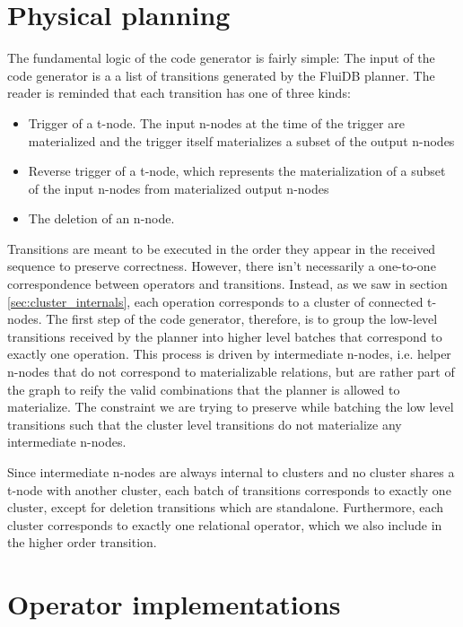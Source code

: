 \section{Physical planning}

The fundamental logic of the code generator is fairly simple: The
input of the code generator is a a list of transitions generated by
the FluiDB planner. The reader is reminded that each transition has
one of three kinds:

\begin{itemize}
\item Trigger of a t-node. The input n-nodes at the time of the trigger
are materialized and the trigger itself materializes a subset of the
output n-nodes
\item Reverse trigger of a t-node, which represents the
materialization of a subset of the input n-nodes from materialized
output n-nodes
\item The deletion of an n-node.
\end{itemize}

Transitions are meant to be executed in the order they appear in the
received sequence to preserve correctness. However, there isn't necessarily a
one-to-one correspondence between operators and transitions. Instead,
as we saw in section \ref{sec:cluster_internals}, each operation
corresponds to a cluster of connected t-nodes. The first step of the
code generator, therefore, is to group the low-level transitions
received by the planner into higher level batches that correspond to
exactly one operation. This process is driven by intermediate n-nodes,
i.e. helper n-nodes that do not correspond to materializable relations,
but are rather part of the graph to reify the valid combinations that
the planner is allowed to materialize. The constraint we are trying to
preserve while batching the low level transitions such that the
cluster level transitions do not materialize any intermediate n-nodes.

Since intermediate n-nodes are always internal to clusters and no
cluster shares a t-node with another cluster, each batch of
transitions corresponds to exactly one cluster, except for deletion
transitions which are standalone. Furthermore, each cluster
corresponds to exactly one relational operator, which we also include
in the higher order transition.

\section{Operator implementations}


